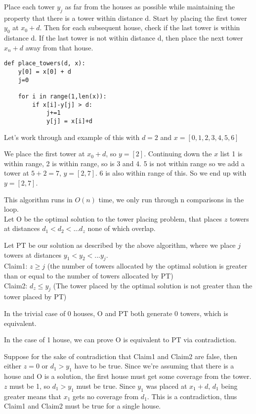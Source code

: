 \documentclass[12pt]{article}
\newenvironment{question}[2][Question]{\begin{trivlist}
		\item[\hskip \labelsep {\bfseries #1}\hskip \labelsep {\bfseries #2.}]}{\end{trivlist}}
\begin{document}
	\begin{question}{4}
		Place each tower $y_j$ as far from the houses as possible while maintaining the property that there is a tower within distance d. Start by placing the first tower $y_0$ at $x_0 + d$. Then for each subsequent house, check if the last tower is within distance d. If the last tower is not within distance d, then place the next tower $x_n+d$ away from that house.
		\begin{lstlisting}
def place_towers(d, x):
	y[0] = x[0] + d
	j=0
	
	for i in range(1,len(x)):
		if x[i]-y[j] > d:
			j+=1
			y[j] = x[i]+d
\end{lstlisting}


Let's work through and example of this with $d=2$ and $x=[0,1,2,3,4,5,6]$

We place the first tower at $x_0 + d$, so $y=[2]$.
Continuing down the $x$ list 1 is within range, 2 is within range, so is 3 and 4. 
5 is not within range so we add a tower at $5+2=7$, $y=[2,7]$. 6 is also within range of this. So we end up with $y=[2,7]$.

This algorithm runs in $O(n)$ time, we only run through n comparisons in the loop. \\

Let O be the optimal solution to the tower placing problem, that places $z$ towers at distances $d_1<d_2<...d_z$ none of which overlap.

Let PT be our solution as described by the above algorithm, where we place $j$ towers at distances $y_1<y_2< ... y_j$.\\

Claim1: $z\geq j$ (the number of towers allocated by the optimal solution is greater than or equal to the number of towers allocated by PT)\\

Claim2: $d_z\leq y_j$ (The tower placed by the optimal solution is not greater than the tower placed by PT)


In the trivial case of 0 houses, O and PT both generate 0 towers, which is equivalent.

In the case of 1 house, we can prove O is equivalent to PT via contradiction.

Suppose for the sake of contradiction that Claim1 and Claim2 are false, then either $z=0$ or $d_1 > y_1$ have to be true. Since we're assuming that there is a house and O is a solution, the first house must get some coverage from the tower. $z$ must be 1, so $d_1 > y_1$ must be true. Since $y_1$ was placed at $x_1+d$, $d_1$ being greater means that $x_1$ gets no coverage from $d_1$. This is a contradiction, thus Claim1 and Claim2 must be true for a single house.



\end{question}
\end{document}
